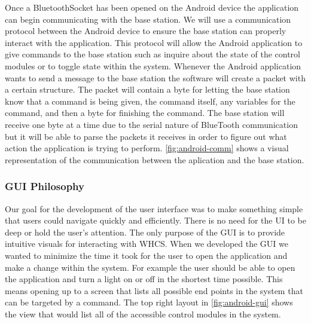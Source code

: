 Once a BluetoothSocket has been opened on the Android device the application
can begin communicating with the base station. We will use a communication
protocol between the Android device to ensure the base station can properly
interact with the application. This protocol will allow the Android application
to give commands to the base station such as inquire about the state of the
control modules or to toggle state within the system. Whenever the Android
application wants to send a message to the base station the software will
create a packet with a certain structure. The packet will contain a byte for
letting the base station know that a command is being given, the command
itself, any variables for the command, and then a byte for finishing the
command. The base station will receive one byte at a time due to the serial
nature of BlueTooth communication but it will be able to parse the packets it
receives in order to figure out what action the application is trying to
perform. \autoref{fig:android-comm} shows a visual representation of the
communication between the aplication and the base station.


\subsubsection{GUI Philosophy} Our goal for the development of the user
interface was to make something simple that users could navigate quickly and
efficiently. There is no need for the UI to be deep or hold the user{}'s
attention. The only purpose of the GUI is to provide intuitive visuals for
interacting with WHCS. When we developed the GUI we wanted to minimize the time
it took for the user to open the application and make a change within the
system. For example the user should be able to open the application and turn a
light on or off in the shortest time possible. This means opening up to a
screen that lists all possible end points in the system that can be targeted by
a command. The top right layout in \autoref{fig:android-gui} shows the view
that would list all of the accessible control modules in the system.


